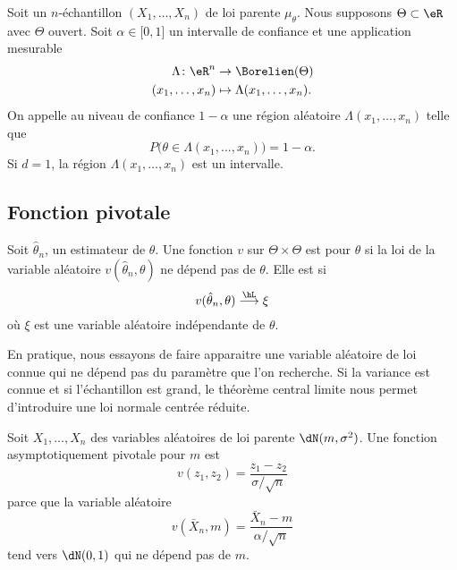 Soit un \( n\)-échantillon \( (X_1,\ldots,X_n)\) de loi parente \( \mu_{\theta}\). Nous supposons \( \Theta\subset\eR\) avec \( \Theta\) ouvert. Soit \( \alpha\in\mathopen[ 0 , 1 \mathclose]\) un intervalle de confiance et une application mesurable
\begin{equation}
    \begin{aligned}
        \Lambda\colon \eR^n&\to \Borelien(\Theta) \\
        (x_1,\ldots,x_n)&\mapsto \Lambda(x_1,\ldots,x_n).
    \end{aligned}
\end{equation}
On appelle  au niveau de confiance \( 1-\alpha\) une région aléatoire \( \Lambda(x_1,\ldots,x_n)\) telle que
\begin{equation}
    P\big( \theta\in\Lambda(x_1,\ldots,x_n) \big)=1-\alpha.
\end{equation}
Si \( d=1\), la région \( \Lambda(x_1,\ldots,x_n)\) est un intervalle.

\subsection{Fonction pivotale}

Soit \( \hat\theta_n\), un estimateur de \( \theta\). Une fonction \( v\) sur \( \Theta\times\Theta\) est  pour \( \theta\) si la loi de la variable aléatoire \( v(\hat\theta_n,\theta)\) ne dépend pas de \( \theta\). Elle est  si
\begin{equation}
    v(\hat\theta_n,\theta)\stackrel{\hL}{\longrightarrow}\xi
\end{equation}
où \( \xi\) est une variable aléatoire indépendante de \( \theta\).

En pratique, nous essayons de faire apparaitre une variable aléatoire de loi connue qui ne dépend pas du paramètre que l'on recherche. Si la variance est connue et si l'échantillon est grand, le théorème central limite nous permet d'introduire une loi normale centrée réduite.

\begin{example}
    Soit \( X_1,\ldots,X_n\) des variables aléatoires de loi parente \( \dN(m,\sigma^2)\). Une fonction asymptotiquement pivotale pour \( m\) est
    \begin{equation}
        v(z_1,z_2)=\frac{ z_1-z_2 }{ \sigma/\sqrt{n} }
    \end{equation}
    parce que la variable aléatoire
    \begin{equation}
        v(\bar X_n,m)=\frac{ \bar X_n-m }{ \alpha/\sqrt{n} }
    \end{equation}
    tend vers \( \dN(0,1)\) qui ne dépend pas de \( m\).
\end{example}

